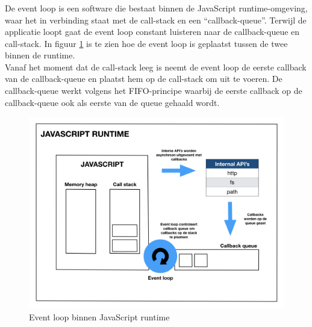 \subsubsection{}
\label{subsubsec:event-loop}

De event loop is een software die bestaat binnen de JavaScript runtime-omgeving, waar het in verbinding staat met de call-stack en een ``callback-queue''. Terwijl de applicatie loopt gaat de event loop constant luisteren naar de callback-queue en call-stack. In figuur \ref{fig:event-loop} is te zien hoe de event loop is geplaatst tussen de twee binnen de runtime. \\
Vanaf het moment dat de call-stack leeg is neemt de event loop de eerste callback van de callback-queue en plaatst hem op de call-stack om uit te voeren. De callback-queue werkt volgens het \gls{FIFO}-principe waarbij de eerste callback op de callback-queue ook als eerste van de queue gehaald wordt.

\begin{figure}[H]
    \includegraphics[width=\linewidth]{img/EventloopInRuntime.jpeg}
    \caption[Event loop in JS runtime]{Event loop binnen JavaScript runtime}
    \label{fig:event-loop}
\end{figure}

\subsubsection{}
\label{subsubsec:non-blocking-io}

